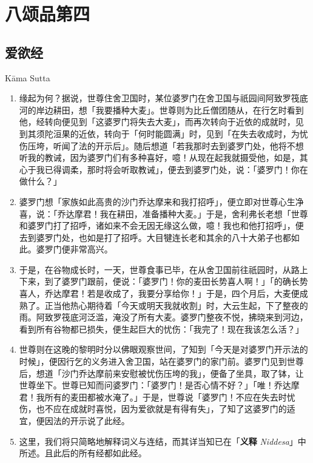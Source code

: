 \chapter{八颂品第四}

\section{爱欲经}

\begin{center}Kāma Sutta\end{center}\vspace{1em}

\begin{enumerate}\item 缘起为何？据说，世尊住舍卫国时，某位婆罗门在舍卫国与祇园间阿致罗筏底河的岸边耕田，想「我要播种大麦」。世尊则为比丘僧团随从，在行乞时看到他，经转向便见到「这婆罗门将失去大麦」，而再次转向于近依的成就时，见到其须陀洹果的近依，转向于「何时能圆满」时，见到「在失去收成时，为忧伤压垮，听闻了法的开示后」。随后想道「若我那时去到婆罗门处，他将不想听我的教诫，因为婆罗门们有多种喜好，噫！从现在起我就摄受他，如是，其心于我已得调柔，那时将会听取教诫」，便去到婆罗门处，说：「婆罗门！你在做什么？」
\item 婆罗门想「家族如此高贵的沙门乔达摩来和我打招呼」，便立即对世尊心生净喜，说：「乔达摩君！我在耕田，准备播种大麦。」于是，舍利弗长老想「世尊和婆罗门打了招呼，诸如来不会无因无缘这么做，噫！我也和他打招呼」，便去到婆罗门处，也如是打了招呼。大目犍连长老和其余的八十大弟子也都如此。婆罗门便非常高兴。
\item 于是，在谷物成长时，一天，世尊食事已毕，在从舍卫国前往祇园时，从路上下来，到了婆罗门跟前，便说：「婆罗门！你的麦田长势喜人啊！」「的确长势喜人，乔达摩君！若是收成了，我要分享给你！」于是，四个月后，大麦便成熟了。正当他热心期待着「今天或明天我就收割」时，大云生起，下了整夜的雨。阿致罗筏底河泛滥，淹没了所有大麦。婆罗门整夜不悦，拂晓来到河边，看到所有谷物都已损失，便生起巨大的忧伤：「我完了！现在我该怎么活？」
\item 世尊则在这晚的黎明时分以佛眼观察世间，了知到「今天是对婆罗门开示法的时候」，便因行乞的义务进入舍卫国，站在婆罗门的家门前。婆罗门见到世尊后，想道「沙门乔达摩前来安慰被忧伤压垮的我」，便备了坐具，取了钵，让世尊坐下。世尊已知而问婆罗门：「婆罗门！是否心情不好？」「唯！乔达摩君！我所有的麦田都被水淹了。」于是，世尊说「婆罗门！不应在失去时忧伤，也不应在成就时喜悦，因为爱欲就是有得有失」，了知了这婆罗门的适宜，便因法的开示说了此经。
\item 这里，我们将只简略地解释词义与连结，而其详当知已在「\textbf{义释} \textit{Niddesa}」中所述。且此后的所有经都如此经。\end{enumerate}

